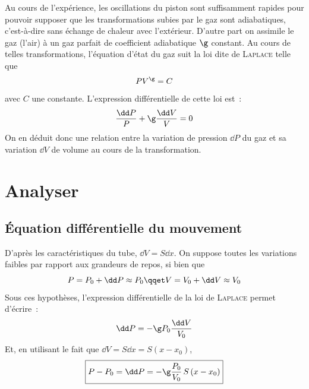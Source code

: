 \documentclass[../main/main.tex]{subfiles}
\begin{document}
{	Au cours de l'expérience, les oscillations du piston sont suffisamment rapides
	pour pouvoir supposer que les transformations subies par le gaz sont
	adiabatiques, c'est-à-dire sans échange de chaleur avec l'extérieur. D'autre
	part on assimile le gaz (l'air) à un gaz parfait de coefficient adiabatique $\g$
	constant. Au cours de telles transformations, l'équation d'état du gaz suit la
	loi dite de \textsc{Laplace} telle que
	\[
		PV^\g = C
	\]
	avec $C$ une constante. L'expression différentielle de cette loi est~:
	\[
		\frac{\dd P}{P} + \g \frac{\dd V}{V} = 0
	\]
	On en déduit donc une relation entre la variation de pression $\dd P$ du gaz et
	sa variation $\dd V$ de volume au cours de la transformation.
}

\setcounter{section}{2}
\section{Analyser}
\subsection{Équation différentielle du mouvement}

D'après les caractéristiques du tube, $\dd V=S \dd x$. On suppose toutes les
variations faibles par rapport aux grandeurs de repos, si bien que
\[
	P = P_0 +\dd P \approx P_0 \qqet V = V_0 +\dd V \approx V_0
\]
Sous ces hypothèses, l'expression différentielle de la loi de \textsc{Laplace}
permet d'écrire~:
\[
	\dd P = -\g P_0 \frac{\dd V}{V_0}
\]
Et, en utilisant le fait que $\dd V = S \dd x = S (x-x_0)$,
\[
	\boxed{P-P_0 = \dd P = - \g \frac{P_0}{V_0} \, S \, (x-x_0)}
\]




\end{document}
